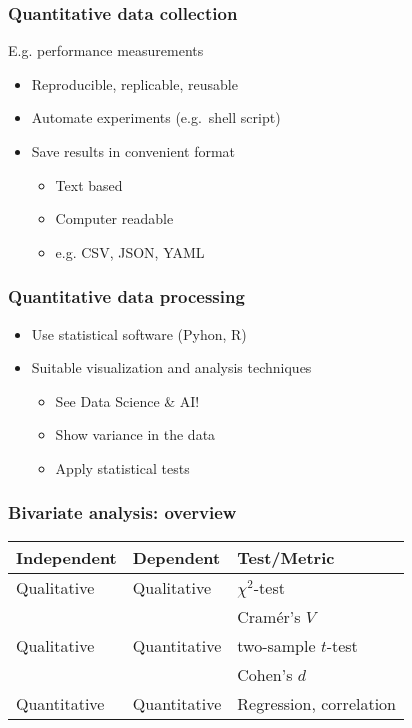 \documentclass[aspectratio=169]{beamer}
\begin{document}
\begin{frame}
  \frametitle{Quantitative data collection}

  E.g. performance measurements

  \begin{itemize}
    \item Reproducible, replicable, reusable
    \item Automate experiments (e.g.\ shell script)
    \item Save results in convenient format
          \begin{itemize}
            \item Text based
            \item Computer readable
            \item e.g. CSV, JSON, YAML
          \end{itemize}
  \end{itemize}

\end{frame}

\begin{frame}
  \frametitle{Quantitative data processing}

  \begin{itemize}
    \item Use statistical software (Pyhon, R)
    \item Suitable visualization and analysis techniques
          \begin{itemize}
            \item See Data Science \& AI!
            \item Show variance in the data
            \item Apply statistical tests
          \end{itemize}
  \end{itemize}

\end{frame}

\begin{frame}
  \frametitle{Bivariate analysis: overview}
  \centering
  \begin{tabular}{lll}
    \toprule
    \textbf{Independent} & \textbf{Dependent} & \textbf{Test/Metric}    \\
    \midrule
    Qualitative          & Qualitative        & $\chi^2$-test           \\
                         &                    & Cramér's $V$            \\
    Qualitative          & Quantitative       & two-sample $t$-test     \\
                         &                    & Cohen's $d$             \\
    Quantitative         & Quantitative       & Regression, correlation \\
    \bottomrule
  \end{tabular}

  \bigskip

\end{frame}
\end{document}
